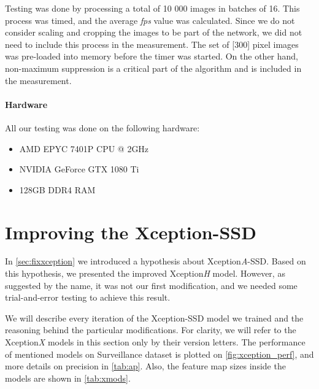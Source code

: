 Testing was done by processing a total of 10 000 images in batches of 16. This process was timed, and the average \textit{fps} value was calculated.  Since we do not consider scaling and cropping the images to be part of the network, we did not need to include this process in the measurement. The set of [300] pixel images was pre-loaded into memory before the timer was started. On the other hand, non-maximum suppression is a critical part of the algorithm and is included in the measurement. 

\paragraph{Hardware} All our testing was done on the following hardware:
\begin{itemize}
    \item AMD EPYC 7401P CPU @ 2GHz 
    \item NVIDIA GeForce GTX 1080 Ti
    \item 128GB DDR4 RAM
\end{itemize}


\section{Improving the Xception-SSD}
In \cref{sec:fixxception} we introduced a hypothesis about Xception\textit{A}-SSD. Based on this hypothesis, we presented the improved Xception\textit{H} model. However, as suggested by the name, it was not our first modification, and we needed some trial-and-error testing to achieve this result.

We will describe every iteration of the Xception-SSD model we trained and the reasoning behind the particular modifications. For clarity, we will refer to the Xception\textit{X} models in this section only by their version letters. The performance of mentioned models on Surveillance dataset is plotted on \cref{fig:xception_perf}, and more details on precision in \cref{tab:ap}. Also, the feature map sizes inside the models are shown in \cref{tab:xmods}.


